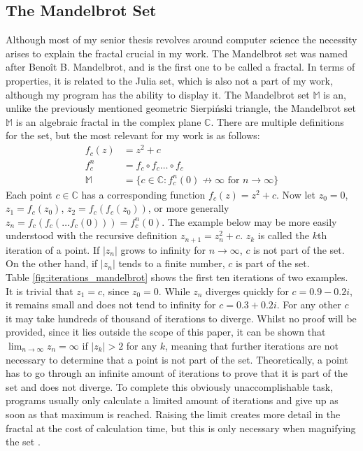 \documentclass[10pt,a4paper,titlepage]{article}
\begin{document}
	\subsection{The Mandelbrot Set}
	Although most of my senior thesis revolves around computer science the necessity arises to explain the fractal crucial in my work. The Mandelbrot set was named after Benoît B. Mandelbrot, and is the first one to be called a fractal. In terms of properties, it is related to the Julia set, which is also not a part of my work, although my program has the ability to display it. The Mandelbrot set \(\mathbb{M}\) is an, unlike the previously mentioned geometric Sierpiński triangle, the Mandelbrot set \(\mathbb{M}\) is an algebraic fractal in the complex plane \(\mathbb{C}\). There are multiple definitions for the set, but the most relevant for my work is as follows:
	\begin{align*}
			f_{c}(z)&=z^2 + c\\
			f_{c}^{n} &= f_{c} \circ f_{c} \dots \circ f_{c}\\
			\mathbb{M} &= \{c \in \mathbb{C}: f_{c}^{n}(0)\not\to\infty \text{ for } n \to \infty\}
	\end{align*}
	Each point \(c \in \mathbb{C}\) has a corresponding function \(f_c(z)=z^2 +c\). Now let \(z_0=0\), \(z_1 = f_c(z_0)\), \(z_2 = f_c(f_c(z_0))\), or more generally \(z_n = f_c(f_c(\dots f_c(0)))= f_c^n(0)\). The example below may be more easily understood with the recursive definition \(z_{n+1}=z_n^2+c\). \(z_k\) is called the \(k\)th iteration of a point. If \(|z_n|\) grows to infinity for \(n \to \infty\), \(c\) is not part of the set. On the other hand, if \(|z_n|\) tends to a finite number, \(c\) is part of the set.\\
	Table \ref{fig:iterations_mandelbrot} shows the first ten iterations of two examples. It is trivial that \(z_1=c\), since \(z_0 = 0\). While \(z_n\) diverges quickly for \(c=0.9 - 0.2i\), it remains small and does not tend to infinity for \(c=0.3+0.2i\). For any other \(c\) it may take hundreds of thousand of iterations to diverge. Whilst no proof will be provided, since it lies outside the scope of this paper, it can be shown that \(\lim_{n\to\infty}z_{n} = \infty\) if \(|z_{k}| > 2\) for any \(k\), meaning that further iterations are not necessary to determine that a point is not part of the set. Theoretically, a point has to go through an infinite amount of iterations to prove that it is part of the set and does not diverge. To complete this obviously unaccomplishable task, programs usually only calculate a limited amount of iterations and give up as soon as that maximum is reached. Raising the limit creates more detail in the fractal at the cost of calculation time, but this is only necessary when magnifying the set \cite[Chapter 14.2]{FalconerKennethJ1993FG:m}.
\end{document}
